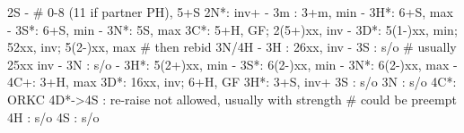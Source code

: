 2S - # 0-8 (11 if partner PH), 5+S
2N*: inv+
   - 3m : 3+m, min
   - 3H*: 6+S, max
   - 3S*: 6+S, min
   - 3N*: 5S, max
3C*: 5+H, GF; 2(5+)xx, inv
   - 3D*: 5(1-)xx, min; 52xx, inv; 5(2-)xx, max  # then rebid 3N/4H
        - 3H : 26xx, inv
        - 3S : s/o  # usually 25xx inv
        - 3N : s/o
   - 3H*: 5(2+)xx, min
   - 3S*: 6(2-)xx, min
   - 3N*: 6(2-)xx, max
   - 4C+: 3+H, max
3D*: 16xx, inv; 6+H, GF
3H*: 3+S, inv+
3S : s/o
3N : s/o
4C*: ORKC
4D*->4S : re-raise not allowed, usually with strength  # could be preempt
4H : s/o
4S : s/o

